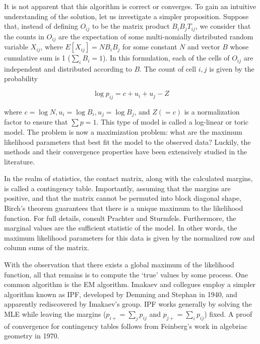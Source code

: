 It is not apparent that this algorithm is correct or converges.  To gain an intuitive understanding of the solution, let us investigate a
simpler proposition.  Suppose that, instead of defining $O_{ij}$ to be the matrix product $B_{i}B_{j}T_{ij}$, we consider that the counts
in $O_{ij}$ are the expectation of some multi-nomially distributed random variable $X_{ij}$, where $E[X_{ij}] = NB_{i}B_j$ for some
constant $N$ and vector $B$ whose cumulative sum is 1 ($\sum_{i}B_i = 1$).  In this formulation, each of the cells of $O_{ij}$ are
independent and distributed according to $B$.  The count of cell $i,j$ is given by the probability

\[
  \log{p_{ij}} =  c + u_i + u_j - Z
\]

where $c = \log{N}, u_i = \log{B_i}, u_j = \log{B_j}$, and $Z (=c)$ is a normalization factor to ensure that $\sum p = 1$.  This type of
model is called a \gls{log-linear} or \gls{toric} model.  The problem is now a maximization problem: what are the maximum likelihood parameters
that best fit the model to the observed data?  Luckily, the methods and their convergence properties have been extensively studied in the
literature\cite{fienburg2012}\cite{pachter2005}.

In the realm of statistics, the contact matrix, along with the calculated margins, is called a \gls{contingency table}.  Importantly, assuming
that the margins are positive, and that the matrix cannot be permuted into block diagonal shape, Birch's theorem guarantees that there is a
unique maximum to the likelihood function\cite{prachter2005}.  For full details, consult Prachter and Sturmfels\cite{prachter2005}.  Furthermore,
the marginal values are the \gls{sufficient statistic} of the model.  In other words, the maximum likelihood parameters for this data is given
by the normalized row and column sums of the matrix\cite{prachter2005}.

With the observation that there exists a global maximum of the likelihood function, all that remains is to compute the `true' values by some
process.  One common algorithm is the \gls{EM} algorithm\cite{fuchs1982}.  Imakaev and collegues employ a simpler algorithm known as \gls{IPF},
developed by Demming and Stephan in 1940, and apparently rediscovered by Imakaev's group\cite{deming1940}.  \gls{IPF} works generally by solving
the \gls{MLE} while leaving the margins ($p_{i+} = \sum_{j}p_{ij}$ and $p_{j+} = \sum_{i}p_{ij}$) fixed.  A proof of convergence for contingency
tables follows from Feinberg's work in algebriac geometry in 1970\cite{feinberg1970}.

